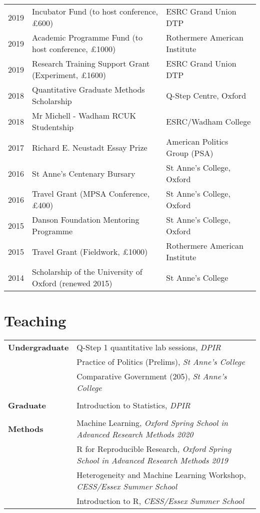 \documentclass[11pt, a4paper]{article}
\begin{document}
 \begin{tabular}{lll}
     2019 & Incubator Fund (to host conference, £600) & ESRC Grand Union DTP \\
     2019 & Academic Programme Fund (to host conference, £1000) & Rothermere American Institute \\
     2019 & Research Training Support Grant (Experiment, £1600) & ESRC Grand Union DTP \\
     2018 & Quantitative Graduate Methods Scholarship & Q-Step Centre, Oxford \\
     2018 & Mr Michell - Wadham RCUK Studentship & ESRC/Wadham College\\
     2017 & Richard E. Neustadt Essay Prize & American Politics Group (PSA) \\
     2016 & St Anne's Centenary Bursary & St Anne's College, Oxford \\
     2016 & Travel Grant (MPSA Conference, £400) & St Anne's College, Oxford \\
     2015 & Danson Foundation Mentoring Programme & St Anne's College, Oxford \\
     2015 & Travel Grant (Fieldwork, £1000) & Rothermere American Institute \\
     2014 & Scholarship of the University of Oxford (renewed 2015) & St Anne's College

 \end{tabular}

 \section*{Teaching}
 \begin{tabular}{p{}|p{}}
     \textbf{Undergraduate} &  Q-Step 1 quantitative lab sessions, \textit{DPIR} \\
      & Practice of Politics (Prelims), \textit{St Anne's College}\\
      & Comparative Government (205), \textit{St Anne's College} \\
      & \\
      \textbf{Graduate} &  Introduction to Statistics, \textit{DPIR} \\
      & \\
      \textbf{Methods} & Machine Learning, \textit{Oxford Spring School in Advanced Research Methods 2020} \\
      & R for Reproducible Research, \textit{Oxford Spring School in Advanced Research Methods 2019} \\
      & Heterogeneity and Machine Learning Workshop, \textit{CESS/Essex Summer School} \\
      & Introduction to R, \textit{CESS/Essex Summer School}
 \end{tabular}
\end{document}
